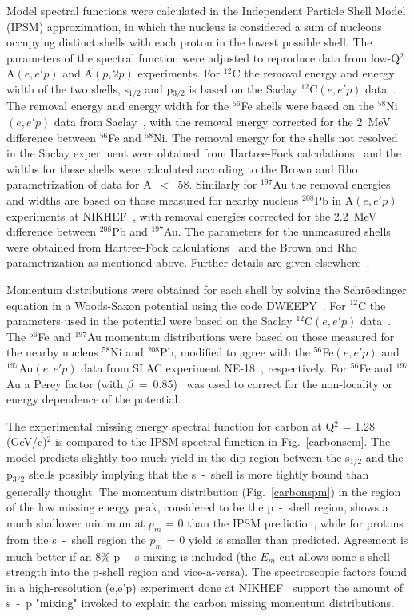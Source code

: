 \documentclass[aps,prl,twocolumn,showpacs,amsmath,amssymb,floats]{revtex4}
\begin{document}
Model spectral functions were calculated in the Independent Particle Shell 
Model (IPSM) approximation, in which the nucleus is considered a sum of 
nucleons occupying distinct shells with each proton in the lowest possible 
shell. The parameters of the spectral function were adjusted to reproduce data
from low-Q$^2$ A$(e,e'p)$ and A$(p,2p)$ experiments. For $^{12}$C the removal energy 
and energy width of the two shells, s$_{1/2}$ and p$_{3/2}$ is based on the Saclay $^{12}$C$(e,e'p)$ data~\cite{moug76}. The removal energy and energy width for the $^{56}$Fe shells were based on the $^{58}$Ni$(e,e'p)$ data from Saclay~\cite{moug76, fesaclay}, with the removal energy corrected for the 2~MeV difference between $^{56}$Fe and $^{58}$Ni. The removal energy for the shells not resolved in the Saclay experiment were obtained from Hartree-Fock calculations~\cite{quintth} and the widths for these shells were calculated according to the Brown and Rho~\cite{rho81} parametrization of data for A~$<$~58. 
Similarly for $^{197}$Au the removal energies and widths are based on those 
measured for nearby nucleus $^{208}$Pb in  A$(e,e'p)$ experiments at NIKHEF~\cite{quintth}, with removal energies corrected for the 2.2~MeV difference between  $^{208}$Pb and $^{197}$Au. The parameters for the unmeasured shells were obtained 
from Hartree-Fock calculations~\cite{quintth} and the Brown and Rho parametrization as mentioned above. Further details are given elsewhere~\cite{thesis}. 

Momentum distributions were obtained for each shell by solving the 
Schr\"{o}edinger equation in a  Woods-Saxon potential using the code 
DWEEPY~\cite{guisti87}.  For  $^{12}$C the parameters used in the potential 
were based on the Saclay $^{12}$C$(e,e'p)$ data~\cite{moug76}. The $^{56}$Fe 
and  $^{197}$Au momentum distributions were based on those measured for the 
nearby nucleus $^{58}$Ni and $^{208}$Pb, modified to agree with the $^{56}$Fe$(e,e'p)$ and $^{197}$Au$(e,e'p)$ data from SLAC experiment NE-18~\cite{tonth}, respectively. For   $^{56}$Fe and  $^{197}$Au a Perey factor (with $\beta$~=~0.85)~\cite{perey63} was used to correct for the non-locality or energy dependence 
of the potential.

The experimental missing energy spectral function for carbon at Q$^2$ = 1.28 
(GeV/c)$^2$ is compared to the IPSM spectral function in Fig.~\ref{carbonsem}.  
The model predicts slightly too much yield in the dip region between the 
s$_{1/2}$ and the p$_{3/2}$ shells possibly implying that the s~-~shell is more 
tightly bound than generally thought.  The momentum distribution 
(Fig.~\ref{carbonspm}) in the region of the low missing energy peak, considered 
to be the p~-~shell region, shows a much shallower minimum at $p_m$ = 0 than the 
IPSM prediction, while for protons from the s~-~shell region the $p_m$ = 0 yield is 
smaller than predicted.  Agreement is much better if an 8\% p~-~s mixing is 
included (the $E_m$ cut allows some s-shell strength into the p-shell region and vice-a-versa). The spectroscopic factors found in a high-resolution (e,e'p) 
experiment done at NIKHEF~\cite{gerard88} support the amount of s~-~p "mixing" 
invoked to explain the carbon missing momentum distributions.
\end{document}
